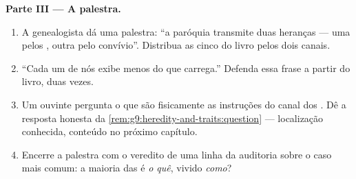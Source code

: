 \begin{problem}
\medskip\noindent\textbf{Parte III --- A palestra.}
\begin{enumerate}[resume]
  \item A genealogista dá uma palestra: ``a paróquia
        transmite duas heranças --- uma pelos , outra
        pelo convívio''. Distribua as cinco 
        do livro pelos dois canais.
  \item ``Cada um de nós exibe menos do que carrega.''
        Defenda essa frase a partir do livro, duas vezes.
  \item Um ouvinte pergunta o que são fisicamente as
        instruções do canal dos . Dê a resposta
        honesta da \cref{rem:g9:heredity-and-traits:question}
        --- localização conhecida, conteúdo no próximo
        capítulo.
  \item Encerre a palestra com o veredito de uma linha da
        auditoria sobre o caso mais comum: a maioria das
         é \emph{o quê}, vivido \emph{como}?
\end{enumerate}
\end{problem}
